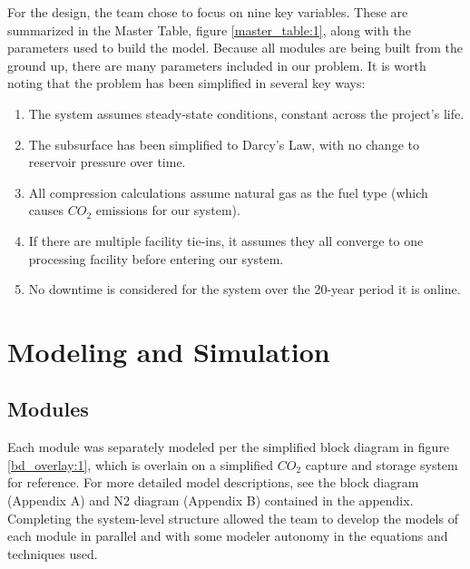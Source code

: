 \documentclass[balance,upint,subscriptcorrection,varvw,mathalfa=cal=boondoxo,spanish,french,vietnamese,russian,greek,pdf-a,colorlinks]{asmeconf}
\begin{document}
For the design, the team chose to focus on nine key variables. These are summarized in the Master Table, figure \ref{master_table:1}, along with the parameters used to build the model. Because all modules are being built from the ground up, there are many parameters included in our problem. It is worth noting that the problem has been simplified in several key ways:
\begin{enumerate}
  \item The system assumes steady-state conditions, constant across the project's life.
  \item The subsurface has been simplified to Darcy's Law, with no change to reservoir pressure over time.
  \item All compression calculations assume natural gas as the fuel type (which causes $CO_{2}$ emissions for our system).
  \item If there are multiple facility tie-ins, it assumes they all converge to one processing facility before entering our system.
  \item No downtime is considered for the system over the 20-year period it is online.
\end{enumerate}


\section{Modeling and Simulation}
\subsection{Modules} 
Each module was separately modeled per the simplified block diagram in figure \ref{bd_overlay:1}, which is overlain on a simplified $CO_{2}$ capture and storage system for reference. For more detailed model descriptions, see the block diagram (Appendix A) and N2 diagram (Appendix B) contained in the appendix. Completing the system-level structure allowed the team to develop the models of each module in parallel and with some modeler autonomy in the equations and techniques used.
\end{document}
